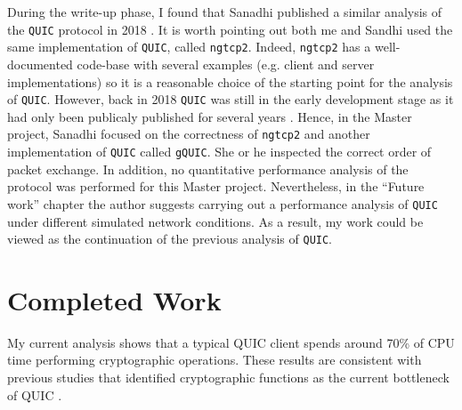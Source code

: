 \documentclass[12pt,a4paper,twoside,openright]{report}
\begin{document}
During the write-up phase, I found that Sanadhi published a similar analysis of the \texttt{QUIC} protocol in 2018 \cite{overview_of_the_QUIC_protocol}.
It is worth pointing out both me and Sandhi used the same implementation of \texttt{QUIC}, called \texttt{ngtcp2}.
Indeed, \texttt{ngtcp2} has a well-documented code-base with several examples (e.g. client and server implementations) so it is a reasonable choice of the starting point for the analysis of \texttt{QUIC}.   
However, back in 2018 \texttt{QUIC} was still in the early development stage as it had only been publicaly published for several years \cite{Chromium_Blog_Experimenting_with_quic}.
Hence, in the Master project, Sanadhi focused on the correctness of \texttt{ngtcp2} and another implementation of \texttt{QUIC} called \texttt{gQUIC}.
She or he inspected the correct order of packet exchange.
In addition, no quantitative performance analysis of the protocol was performed for this Master project. 
Nevertheless, in the \enquote{Future work} chapter the author suggests carrying out a performance analysis of \texttt{QUIC} under different simulated network conditions.
As a result, my work could be viewed as the continuation of the previous analysis of \texttt{QUIC}.







\section{Completed Work}
My current analysis shows that a typical QUIC client spends around 70\% of CPU time performing cryptographic operations. 
These results are consistent with previous studies that identified cryptographic functions as the current bottleneck of QUIC \cite{Making_QUIC_Quicker}.








\end{document}

